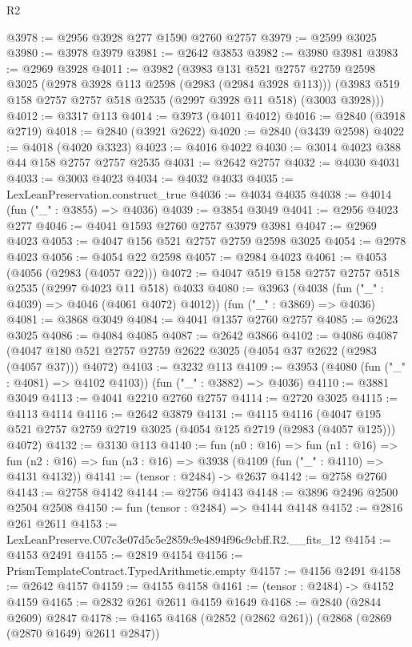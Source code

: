 \begin{lexlean}{R2}
\begin{coremodule}
@3978 := @2956 @3928 @277 @1590 @2760 @2757
@3979 := @2599 @3025
@3980 := @3978 @3979
@3981 := @2642 @3853
@3982 := @3980 @3981
@3983 := @2969 @3928
@4011 := @3982
    (@3983
      @131
      @521
      @2757
      @2759
      @2598
      @3025
      (@2978 @3928 @113 @2598 (@2983 (@2984 @3928 @113)))
      (@3983 @519 @158 @2757 @2757 @518 @2535 (@2997 @3928 @11 @518) (@3003 @3928)))
@4012 := @3317 @113
@4014 := @3973 (@4011 @4012)
@4016 := @2840 (@3918 @2719)
@4018 := @2840 (@3921 @2622)
@4020 := @2840 (@3439 @2598)
@4022 := @4018 (@4020 @3323)
@4023 := @4016 @4022
@4030 := @3014 @4023 @388 @44 @158 @2757 @2757 @2535
@4031 := @2642 @2757
@4032 := @4030 @4031
@4033 := @3003 @4023
@4034 := @4032 @4033
@4035 := LexLeanPreservation.construct_true
@4036 := @4034 @4035
@4038 := @4014 (fun ("_" : @3855) => @4036)
@4039 := @3854 @3049
@4041 := @2956 @4023 @277
@4046 := @4041 @1593 @2760 @2757 @3979 @3981
@4047 := @2969 @4023
@4053 := @4047 @156 @521 @2757 @2759 @2598 @3025
@4054 := @2978 @4023
@4056 := @4054 @22 @2598
@4057 := @2984 @4023
@4061 := @4053 (@4056 (@2983 (@4057 @22)))
@4072 := @4047 @519 @158 @2757 @2757 @518 @2535 (@2997 @4023 @11 @518) @4033
@4080 := @3963 (@4038 (fun ("_" : @4039) => @4046 (@4061 @4072) @4012)) (fun ("_" : @3869) => @4036)
@4081 := @3868 @3049
@4084 := @4041 @1357 @2760 @2757
@4085 := @2623 @3025
@4086 := @4084 @4085
@4087 := @2642 @3866
@4102 := @4086
    @4087
    (@4047 @180 @521 @2757 @2759 @2622 @3025 (@4054 @37 @2622 (@2983 (@4057 @37))) @4072)
@4103 := @3232 @113
@4109 := @3953 (@4080 (fun ("_" : @4081) => @4102 @4103)) (fun ("_" : @3882) => @4036)
@4110 := @3881 @3049
@4113 := @4041 @2210 @2760 @2757
@4114 := @2720 @3025
@4115 := @4113 @4114
@4116 := @2642 @3879
@4131 := @4115
    @4116
    (@4047 @195 @521 @2757 @2759 @2719 @3025 (@4054 @125 @2719 (@2983 (@4057 @125))) @4072)
@4132 := @3130 @113
@4140 := fun (n0 : @16) =>
  fun (n1 : @16) =>
  fun (n2 : @16) => fun (n3 : @16) => @3938 (@4109 (fun ("_" : @4110) => @4131 @4132))
@4141 := (tensor : @2484) -> @2637
@4142 := @2758 @2760
@4143 := @2758 @4142
@4144 := @2756 @4143
@4148 := @3896 @2496 @2500 @2504 @2508
@4150 := fun (tensor : @2484) => @4144 @4148
@4152 := @2816 @261 @2611
@4153 := LexLeanPreserve.C07c3e07d5c5e2859c9e4894f96c9cbff.R2.__fits_12
@4154 := @4153 @2491
@4155 := @2819 @4154
@4156 := PrismTemplateContract.TypedArithmetic.empty
@4157 := @4156 @2491
@4158 := @2642 @4157
@4159 := @4155 @4158
@4161 := (tensor : @2484) -> @4152 @4159
@4165 := @2832 @261 @2611 @4159 @1649
@4168 := @2840 (@2844 @2609) @2847
@4178 := @4165 @4168 (@2852 (@2862 @261)) (@2868 (@2869 (@2870 @1649) @2611 @2847))

\end{coremodule}
\end{lexlean}
